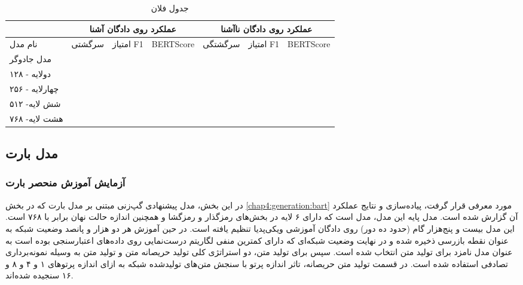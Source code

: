 \begin{table}[h]
	\caption{جدول فلان}
	\label{table:generation:bert2bert:beam4}
	\begin{tabular}{|l|l|l|l|l|l|l|}
		\hline
		& \multicolumn{3}{c|}{عملکرد روی دادگان آشنا} & \multicolumn{3}{c|}{عملکرد روی دادگان نا‌آشنا} \\ \hline
		نام مدل        & سرگشتی      & امتیاز F1     & BERTScore     & سرگشتگی      & امتیاز F1      & BERTScore      \\ \hline
		مدل جادوگر     &             &               &               &              &                &                \\ \hline
		دولایه - ۱۲۸   &             &               &               &              &                &                \\ \hline
		چهارلایه - ۲۵۶ &             &               &               &              &                &                \\ \hline
		شش لایه- ۵۱۲   &             &               &               &              &                &                \\ \hline
		هشت لایه- ۷۶۸  &             &               &               &              &                &                \\ \hline
	\end{tabular}
\end{table}


\subsection{مدل بارت}

\subsubsection{آزمایش آموزش منحصر بارت} \label{chap5:bart:plain}
در این بخش،‌ مدل پیشنهادی گپ‌زنی مبتنی بر مدل بارت که در بخش 
\ref{chap4:generation:bart}
مورد معرفی قرار گرفت، پیاده‌سازی و نتایج عملکرد آن گزارش شده است. مدل پایه این مدل، مدل 
است که دارای ۶ لایه در بخش‌های رمزگذار و رمزگشا و همچنین اندازه حالت نهان برابر با ۷۶۸ است. این مدل بیست و پنج‌هزار گام (حدود ده دور) روی دادگان آموزشی ویکی‌پدیا تنظیم یافته است. 
در حین آموزش هر دو هزار و پانصد وضعیت شبکه به عنوان نقطه بازرسی ذخیره شده و در نهایت وضعیت شبکه‌ای که دارای کمترین منفی لگاریتم درست‌نمایی روی داده‌های اعتبارسنجی بوده است به عنوان مدل نامزد برای تولید متن انتخاب شده است. 
سپس برای تولید متن،‌ دو استراتژی کلی تولید حریصانه متن و تولید متن به وسیله نمونه‌برداری تصادفی استفاده شده است. در قسمت تولید متن حریصانه، تاثر اندازه پرتو با سنجش متن‌های تولید‌شده شبکه به ازای اندازه پرتو‌های ۱ و ۴ و ۸ و ۱۶ سنجیده شده‌اند. 


